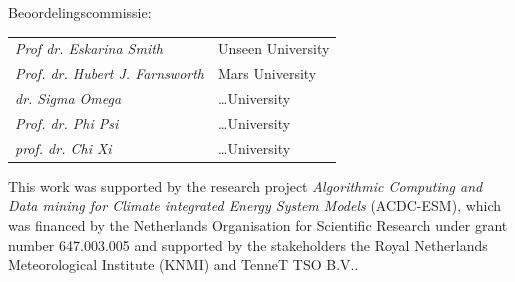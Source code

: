 \begin{titlepage}
\vspace*{2\bigskipamount}



Beoordelingscommissie: \\[\medskipamount] 
\begin{tabular}{@{}p{}@{}p{}}           
        \textit{Prof dr. Eskarina Smith} &  Unseen University \\[\medskipamount]   
        \textit{Prof. dr. Hubert J. Farnsworth} &  Mars University \\[\medskipamount]
        \textit{dr. Sigma Omega} &  \ldots University \\[\medskipamount]
        \textit{Prof. dr. Phi Psi} &  \ldots University \\[\medskipamount]
        \textit{prof. dr. Chi Xi} &  \ldots University\\[\medskipamount]
\end{tabular}




\vfill

\vspace*{2\bigskipamount}

\noindent This work was supported by the research project \emph{Algorithmic Computing and Data mining for Climate integrated Energy System Models} (ACDC-ESM), which was financed by the Netherlands Organisation for Scientific Research under grant number 647.003.005 and supported by the stakeholders the Royal Netherlands Meteorological Institute (KNMI) and TenneT TSO B.V..


\end{titlepage}
